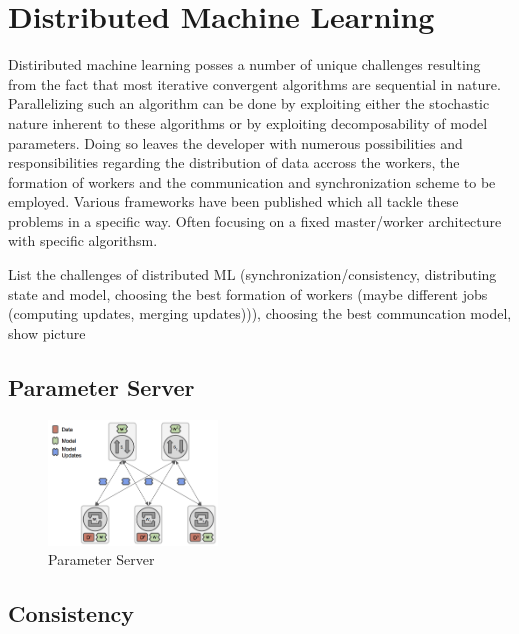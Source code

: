 \section{Distributed Machine Learning}
\label{s:distributed_ml}
Distiributed machine learning posses a number of unique challenges resulting from the fact that most iterative convergent algorithms are sequential in nature. Parallelizing such an algorithm can be done by exploiting either the stochastic nature inherent to these algorithms or by exploiting decomposability of model parameters. Doing so leaves the developer with numerous possibilities and responsibilities regarding the distribution of data accross the workers, the formation of workers and the communication and synchronization scheme to be employed. Various frameworks have been published which all tackle these problems in a specific way. Often focusing on a fixed master/worker architecture with specific algorithsm.

List the challenges of distributed ML (synchronization/consistency, distributing state and model, choosing the best formation of workers (maybe different jobs (computing updates, merging updates))), choosing the best communcation model, show picture


\subsection{Parameter Server}

\begin{figure}[h]
\centering
\includegraphics[width=0.4\textwidth]{img/param_server.png}
\caption{Parameter Server}
\label{fig:param_server}
\end{figure}


\subsection{Consistency}

